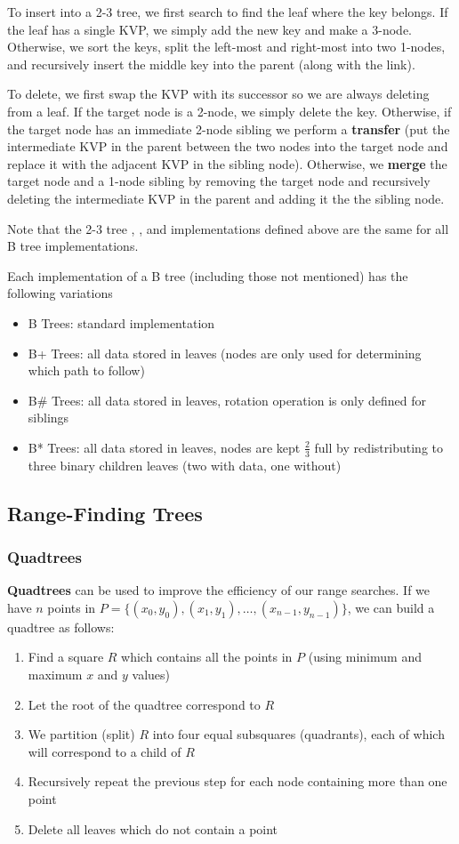 \documentclass[12pt]{article}
\begin{document}
To insert into a 2-3 tree, we first search to find the leaf where the key belongs. If the leaf has a single KVP, we simply add the new key and make a 3-node. Otherwise, we sort the keys, split the left-most and right-most into two 1-nodes, and recursively insert the middle key into the parent (along with the link).

To delete, we first swap the KVP with its successor so we are always deleting from a leaf. If the target node is a 2-node, we simply delete the key. Otherwise, if the target node has an immediate 2-node sibling we perform a {\bf transfer} (put the intermediate KVP in the parent between the two nodes into the target node and replace it with the adjacent KVP in the sibling node). Otherwise, we {\bf merge} the target node and a 1-node sibling by removing the target node and recursively deleting the intermediate KVP in the parent and adding it the the sibling node.

Note that the 2-3 tree , , and  implementations defined above are the same for all B tree implementations.

Each implementation of a B tree (including those not mentioned) has the following variations
\begin{itemize}
\item B Trees: standard implementation
\item B+ Trees: all data stored in leaves (nodes are only used for determining which path to follow)
\item B\# Trees: all data stored in leaves, rotation operation is only defined for siblings
\item B* Trees: all data stored in leaves, nodes are kept $\frac{2}{3}$ full by redistributing to three binary children leaves (two with data, one without)
\end{itemize}

\subsection{Range-Finding Trees}
\subsubsection{Quadtrees}
{\bf Quadtrees} can be used to improve the efficiency of our range searches. If we have $n$ points in $P = \{(x_0,y_0), (x_1,y_1), \dots, (x_{n-1},y_{n-1})\}$, we can build a quadtree as follows:
\begin{enumerate}
\item Find a square $R$ which contains all the points in $P$ (using minimum and maximum $x$ and $y$ values)
\item Let the root of the quadtree correspond to $R$
\item We partition (split) $R$ into four equal subsquares (quadrants), each of which will correspond to a child of $R$
\item Recursively repeat the previous step for each node containing more than one point
\item Delete all leaves which do not contain a point
\end{enumerate}
\end{document}
